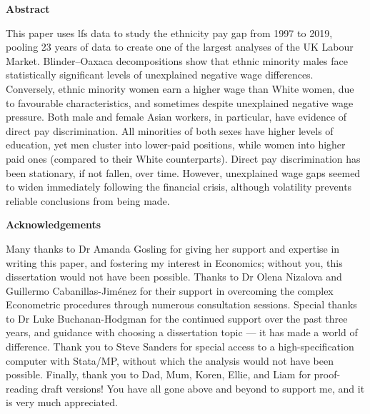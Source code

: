 \documentclass[class=article, crop=false]{standalone}
\begin{document}
\thispagestyle{plain}
\begin{center}
   \textbf{Abstract} 
\end{center}
This paper uses \acrlong{lfs} data to study the ethnicity pay gap from 1997 to 2019, pooling 23 years of data to create one of the largest analyses of the UK Labour Market. Blinder–Oaxaca decompositions show that ethnic minority males face statistically significant levels of unexplained negative wage differences. Conversely, ethnic minority women earn a higher wage than White women, due to favourable characteristics, and sometimes despite unexplained negative wage pressure. Both male and female Asian workers, in particular, have evidence of  direct pay discrimination. All minorities of both sexes have higher levels of education, yet men cluster into lower-paid positions, while women into higher paid ones (compared to their White counterparts). Direct pay discrimination has been stationary, if not fallen, over time. However, unexplained wage gaps seemed to widen immediately following the financial crisis, although volatility prevents reliable conclusions from being made.


\vspace{50pt}
\begin{center}
   \textbf{Acknowledgements}
\end{center}
\linebreak
Many thanks to Dr Amanda Gosling for giving her support and expertise in writing this paper, and fostering my interest in Economics; without you, this dissertation would not have been possible. Thanks to Dr Olena Nizalova and Guillermo Cabanillas-Jiménez for their support in overcoming the complex Econometric procedures through numerous consultation sessions. Special thanks to Dr Luke Buchanan-Hodgman for the continued support over the past three years, and guidance with choosing a dissertation topic --- it has made a world of difference. Thank you to Steve Sanders for special access to a high-specification computer with Stata/MP, without which the analysis would not have been possible. Finally, thank you to Dad, Mum, Koren, Ellie, and Liam for proof-reading draft versions! You have all gone above and beyond to support me, and it is very much appreciated.
\end{document}
